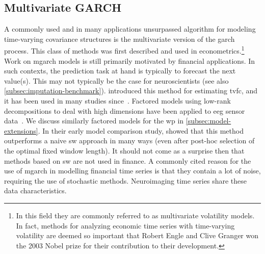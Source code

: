 \subsection{Multivariate GARCH}

A commonly used and in many applications unsurpassed algorithm for modeling time-varying covariance structures is the multivariate version of the \gls{garch}~\parencite{Engle1982, Bollerslev1986} process.
This class of methods was first described and used in econometrics.\footnote{In this field they are commonly referred to as multivariate volatility models. In fact, methods for analyzing economic time series with time-varying volatility are deemed so important that Robert Engle and Clive Granger won the 2003 Nobel prize for their contribution to their development.}
Work on \gls{mgarch} models is still primarily motivated by financial applications.
In such contexts, the prediction task at hand is typically to forecast the next value(s).
This may not typically be the case for neuroscientists (see also \cref{subsec:imputation-benchmark}).
%
\textcite{Lindquist2014} introduced this method for estimating \gls{tvfc}, and it has been used in many studies since~\parencite[see e.g.][]{Choe2017, Preti2017, Foti2019, Hakimdavoodi2020}.
Factored models using low-rank decompositions to deal with high dimensions have been applied to \gls{eeg} sensor data~\parencite{Nakajima2017}.
We discuss similarly factored models for the \gls{wp} in \cref{subsec:model-extensions}.
%
In their early model comparison study, \textcite{Lindquist2014} showed that this method outperforms a naive \gls{sw} approach in many ways (even after post-hoc selection of the optimal fixed window length).
It should not come as a surprise then that methods based on \gls{sw} are not used in finance.
%
A commonly cited reason for the use of \gls{mgarch} in modelling financial time series is that they contain a lot of noise, requiring the use of stochastic methods.
Neuroimaging time series share these data characteristics.

